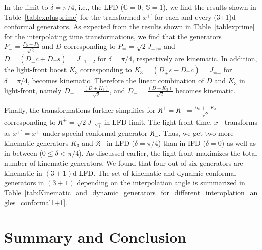 \documentclass[journal,article,submit,pdftex,moreauthors]{Definitions/mdpi}
\begin{document}
In the limit to $\delta=\pi/4$, i.e., the LFD ($\mathbb{C}=0;~\mathbb{S}=1$), we find the results shown in Table~\ref{tablexplusprime} for the transformed $x^{+\prime}$ for each and every (3+1)d conformal generators. As expected from the results shown in Table~\ref{tablexprime} for the interpolating time transformations, we find that the generators $P_{-} = \frac{P_{0}-P_{3}}{\sqrt{2}}$ and $D$ corresponding to $P_{\hat -} = \sqrt{2}J_{-1\hat{-}}$ and $D=\left(D_{\hat{+}}c+D_{\hat{-}}s\right)=J_{-1 -2}$ for $\delta =\pi/4$, respectively are kinematic. In addition, the light-front boost $K_3$ corresponding to $K_3=\left(D_{\hat{+}}s-D_{\hat{-}}c\right)=J_{\hat{-}\hat{+}}$ for $\delta =\pi/4$,  becomes kinematic. Therefore the linear combination of $D$ and $K_3$ in light-front, namely  $D_{+}=\frac{(D+K_3)}{\sqrt{2}} $, and $D_{-}=\frac{(D-K_3)}{\sqrt{2}}$ becomes kinematic. 

Finally, the transformations further simplifies for $\mathfrak{K}^{+}=\mathfrak{K}_{-}=\frac{\mathfrak{K}_{0}+\mathfrak-K_3}{\sqrt{2}}$ corresponding to $\mathfrak{K}^{\hat{+}}=\sqrt{2}J_{-2\hat{+}}$ in LFD limit. The light-front time, $x^{+}$ transforms as $ x^{+\prime} =x^{+}$ under special conformal generator $\mathfrak{K}_{-}$. Thus, we get two more kinematic generators $K_3$ and $\mathfrak{K}^{+}$ in LFD ($\delta = \pi/4$) than in IFD ($\delta = 0$) as well as in between ($0 \le \delta <\pi/4$). As discussed earlier, the light-front maximizes the total number of kinematic generators. We found that four out of six generators are kinematic in $(3+1)$d LFD. The set of kinematic and dynamic conformal generators in $(3+1)$ depending on the interpolation angle is summarized in Table~\ref {tab:Kinematic_and_dynamic_generators_for_different_interoplation_angles_conformal1+1}.


\section{Summary and Conclusion}
\label{summary-conclusion}



\appendix





\end{document}
